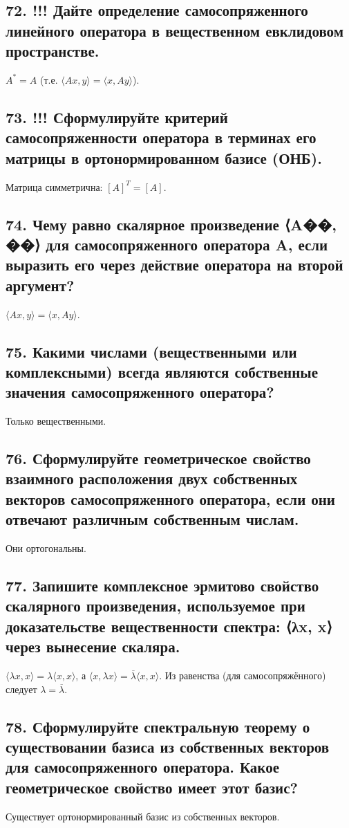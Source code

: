 \documentclass[a4paper,12pt]{article}
\begin{document}
\subsection*{72. !!! Дайте определение самосопряженного линейного оператора в вещественном евклидовом пространстве.}
\(A^* = A\) (т.е. \(\langle A x, y \rangle = \langle x, A y \rangle\)).

\subsection*{73. !!! Сформулируйте критерий самосопряженности оператора в терминах его матрицы в ортонормированном базисе (ОНБ).}
Матрица симметрична: \([A]^T = [A]\).

\subsection*{74. Чему равно скалярное произведение ⟨A��, ��⟩ для самосопряженного оператора A, если выразить его через действие оператора на второй аргумент?}
\(\langle A x, y \rangle = \langle x, A y \rangle\).

\subsection*{75. Какими числами (вещественными или комплексными) всегда являются собственные значения самосопряженного оператора?}
Только вещественными.

\subsection*{76. Сформулируйте геометрическое свойство взаимного расположения двух собственных векторов самосопряженного оператора, если они отвечают различным собственным числам.}
Они ортогональны.

\subsection*{77. Запишите комплексное эрмитово свойство скалярного произведения, используемое при доказательстве вещественности спектра: ⟨λx, x⟩ через вынесение скаляра.}
\(\langle \lambda x, x \rangle = \lambda \langle x, x \rangle\), а \(\langle x, \lambda x \rangle = \overline{\lambda} \langle x, x \rangle\). Из равенства (для самосопряжённого) следует \(\lambda = \overline{\lambda}\).

\subsection*{78. Сформулируйте спектральную теорему о существовании базиса из собственных векторов для самосопряженного оператора. Какое геометрическое свойство имеет этот базис?}
Существует ортонормированный базис из собственных векторов.
\end{document}
